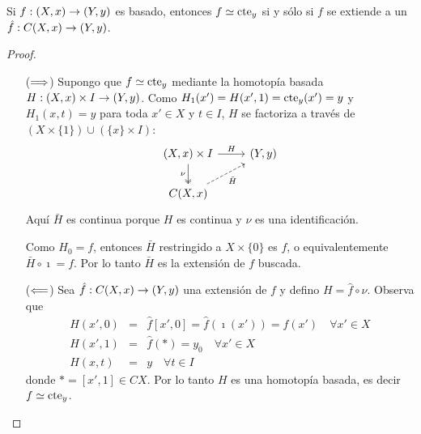 \begin{ejercicio}\label{ej:37}
  Si $f:(X,x)\rightarrow(Y,y)$ es basado, entonces $f\simeq\text{cte}_y$ si y s\'olo si $f$ se extiende a un
  $\hat{f}:C(X,x)\rightarrow(Y,y)$.
\end{ejercicio}
\begin{proof}%
\begin{enumerate}
  \item[($\Longrightarrow$)]
    Supongo que $f\simeq\text{cte}_y$ mediante la homotop\'ia basada $H:(X,x)\times I\rightarrow (Y,y)$. Como
    $H_1(x')=H(x',1)=\text{cte}_y(x')=y$ y $H_1(x,t)=y$ para toda $x'\in X$ y $t\in I$,
    $H$ se factoriza a trav\'es de $(X\times\{1\})\cup(\{x\}\times I)$:
    \[
      \begin{tikzcd}
        (X,x)\times I \arrow[r,"H"] \arrow[d,two heads,"\nu"'] & (Y,y) \\
        C(X,x) \arrow[ur,dashed,"\bar{H}"'] &
      \end{tikzcd}
    \]
    Aqu\'i $\bar{H}$ es continua porque $H$ es continua y $\nu$ es una identificaci\'on.
  
    Como $H_0=f$, entonces $\bar{H}$ restringido a $X\times\{0\}$ es $f$, o equivalentemente
    $\bar{H}\circ\imath=f$. Por lo tanto $\bar{H}$ es la extensi\'on de $f$ buscada.
  \item[($\Longleftarrow$)] Sea $\hat{f}:C(X,x)\rightarrow (Y,y)$ una extensi\'on de $f$ y defino $H=\hat{f}\circ\nu$.
    Observa que
    \begin{eqnarray*}
      H(x',0)&=&\hat{f}[x',0]=\hat{f}(\imath(x'))=f(x') \quad\forall x'\in X \\
      H(x',1)&=&\hat{f}(*)=y_0 \quad\forall x'\in X\\
      H(x,t)&=& y \quad\forall t\in I
    \end{eqnarray*}
    donde $*=[x',1]\in CX$. Por lo tanto $H$ es una homotop\'ia basada, es decir $f\simeq \text{cte}_y$.
\end{enumerate}
\end{proof}%

